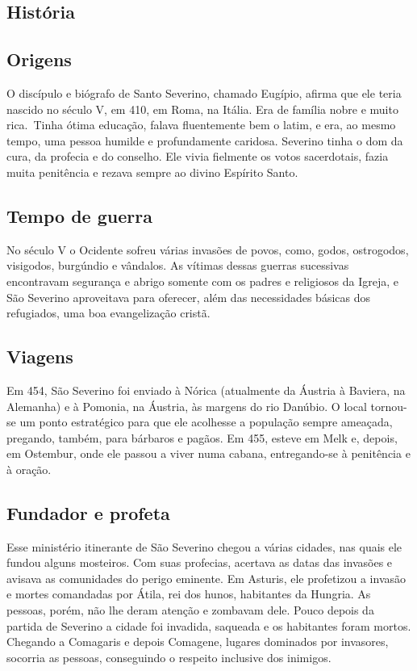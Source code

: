 \documentclass[18pt]{article}
\begin{document}
\begin{justify}

 \begin{center}
  \section{História}\label{sec:História} %
 \end{center}

 \subsection{Origens}
O discípulo e biógrafo de Santo Severino, chamado Eugípio, afirma que ele teria nascido no século V, em 410, em Roma, na Itália. Era de família nobre e muito rica. Tinha ótima educação, falava fluentemente bem o latim, e era, ao mesmo tempo, uma pessoa humilde e profundamente caridosa. Severino tinha o dom da cura, da profecia e do conselho. Ele vivia fielmente os votos sacerdotais, fazia muita penitência e rezava sempre ao divino Espírito Santo.


\subsection{Tempo de guerra}
No século V o Ocidente sofreu várias invasões de povos, como, godos, ostrogodos, visigodos, burgúndio e vândalos. As vítimas dessas guerras sucessivas encontravam segurança e abrigo somente com os padres e religiosos da Igreja, e São Severino aproveitava para oferecer, além das necessidades básicas dos refugiados, uma boa evangelização cristã.

\subsection{Viagens}
Em 454, São Severino foi enviado à Nórica (atualmente da Áustria à Baviera, na Alemanha) e à Pomonia, na Áustria, às margens do rio Danúbio. O local tornou-se um ponto estratégico para que ele acolhesse a população sempre ameaçada, pregando, também, para bárbaros e pagãos. Em 455, esteve em Melk e, depois, em Ostembur, onde ele passou a viver numa cabana, entregando-se à penitência e à oração.

\subsection{Fundador e profeta}
Esse ministério itinerante de São Severino chegou a várias cidades, nas quais ele fundou alguns mosteiros. Com suas profecias, acertava as datas das invasões e avisava as comunidades do perigo eminente. Em Asturis, ele profetizou a invasão e mortes comandadas por Átila, rei dos hunos, habitantes da Hungria. As pessoas, porém, não lhe deram atenção e zombavam dele. Pouco depois da partida de Severino a cidade foi invadida, saqueada e os habitantes foram mortos. Chegando a Comagaris e depois Comagene, lugares dominados por invasores, socorria as pessoas, conseguindo o respeito inclusive dos inimigos.


\end{justify}
\end{document}
